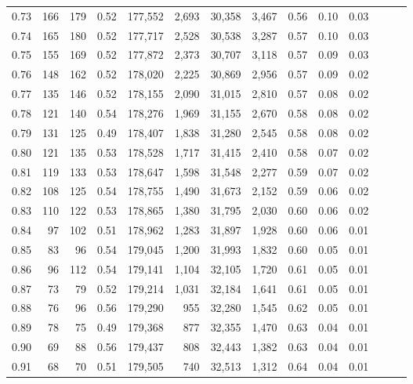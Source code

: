 \begin{tabular}{rrrrrrrrrrrrrr}
0.73 &    166 &  179 &  0.52 &  177,552 &    2,693 &  30,358 &   3,467 &  0.56 &  0.10 &      0.03 \\
0.74 &    165 &  180 &  0.52 &  177,717 &    2,528 &  30,538 &   3,287 &  0.57 &  0.10 &      0.03 \\
0.75 &    155 &  169 &  0.52 &  177,872 &    2,373 &  30,707 &   3,118 &  0.57 &  0.09 &      0.03 \\
0.76 &    148 &  162 &  0.52 &  178,020 &    2,225 &  30,869 &   2,956 &  0.57 &  0.09 &      0.02 \\
0.77 &    135 &  146 &  0.52 &  178,155 &    2,090 &  31,015 &   2,810 &  0.57 &  0.08 &      0.02 \\
0.78 &    121 &  140 &  0.54 &  178,276 &    1,969 &  31,155 &   2,670 &  0.58 &  0.08 &      0.02 \\
0.79 &    131 &  125 &  0.49 &  178,407 &    1,838 &  31,280 &   2,545 &  0.58 &  0.08 &      0.02 \\
0.80 &    121 &  135 &  0.53 &  178,528 &    1,717 &  31,415 &   2,410 &  0.58 &  0.07 &      0.02 \\
0.81 &    119 &  133 &  0.53 &  178,647 &    1,598 &  31,548 &   2,277 &  0.59 &  0.07 &      0.02 \\
0.82 &    108 &  125 &  0.54 &  178,755 &    1,490 &  31,673 &   2,152 &  0.59 &  0.06 &      0.02 \\
0.83 &    110 &  122 &  0.53 &  178,865 &    1,380 &  31,795 &   2,030 &  0.60 &  0.06 &      0.02 \\
0.84 &     97 &  102 &  0.51 &  178,962 &    1,283 &  31,897 &   1,928 &  0.60 &  0.06 &      0.01 \\
0.85 &     83 &   96 &  0.54 &  179,045 &    1,200 &  31,993 &   1,832 &  0.60 &  0.05 &      0.01 \\
0.86 &     96 &  112 &  0.54 &  179,141 &    1,104 &  32,105 &   1,720 &  0.61 &  0.05 &      0.01 \\
0.87 &     73 &   79 &  0.52 &  179,214 &    1,031 &  32,184 &   1,641 &  0.61 &  0.05 &      0.01 \\
0.88 &     76 &   96 &  0.56 &  179,290 &      955 &  32,280 &   1,545 &  0.62 &  0.05 &      0.01 \\
0.89 &     78 &   75 &  0.49 &  179,368 &      877 &  32,355 &   1,470 &  0.63 &  0.04 &      0.01 \\
0.90 &     69 &   88 &  0.56 &  179,437 &      808 &  32,443 &   1,382 &  0.63 &  0.04 &      0.01 \\
0.91 &     68 &   70 &  0.51 &  179,505 &      740 &  32,513 &   1,312 &  0.64 &  0.04 &      0.01 \\

\end{tabular}
